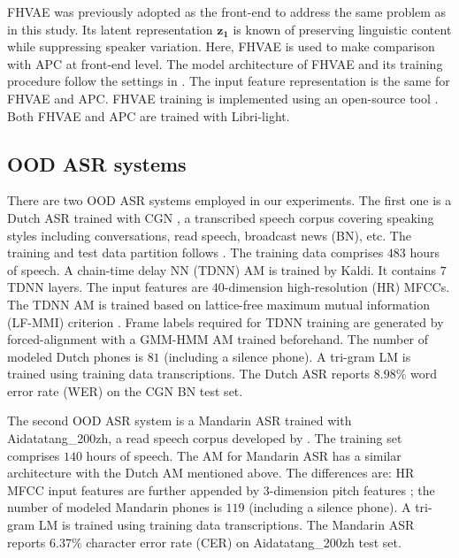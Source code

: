 \documentclass[a4paper]{article}
\begin{document}
FHVAE was previously adopted \cite{Feng2019improving} as the front-end to address the same problem as in this study. Its latent representation $\bm{z_1}$ is known of preserving linguistic content while suppressing speaker variation. Here, FHVAE is used to make comparison with APC at front-end level. The model architecture of FHVAE and its training procedure follow the settings in \cite{Feng2019improving}.
The input feature representation is the same for FHVAE and  APC. FHVAE training is implemented using an open-source tool \cite{hsu2017nips}. Both FHVAE and APC are trained with Libri-light. 
\subsection{OOD ASR systems}
There are two OOD ASR systems employed in our experiments. The first one is a Dutch ASR trained with CGN \cite{oostdijk2000spoken}, a transcribed speech corpus covering  speaking styles including conversations, read speech, broadcast news (BN), etc.
The training and test data partition follows \cite{laurensw75cgn_kaldi}. The training data comprises $483$
 hours of speech. A chain-time delay NN (TDNN) AM \cite{povey2016purely} is trained by Kaldi. It contains $7$ TDNN layers. The input features are $40$-dimension high-resolution (HR) MFCCs. 
 The TDNN AM is trained based on lattice-free maximum mutual information (LF-MMI) criterion \cite{povey2016purely}. Frame labels required for TDNN training are generated by forced-alignment with a GMM-HMM AM trained beforehand. The number of modeled Dutch phones is $81$ (including a silence phone).
 A tri-gram LM is trained using training data transcriptions. 
The Dutch ASR reports $8.98\%$ word error rate (WER) on the CGN BN test set.

The second OOD ASR system is a Mandarin ASR trained with Aidatatang\_200zh, a read speech corpus developed by \cite{aidatatang}. The training set comprises $140$ hours of speech. 
The AM for Mandarin ASR has a similar architecture with the Dutch AM mentioned above. The differences are: HR MFCC input  features are further appended by $3$-dimension pitch features \cite{ghahremani2014pitch}; the number of modeled Mandarin phones is $119$ (including a silence phone). 
A tri-gram LM is trained using training data transcriptions.
The Mandarin ASR reports $6.37\%$ character error rate (CER) on Aidatatang\_200zh test set.
\end{document}
